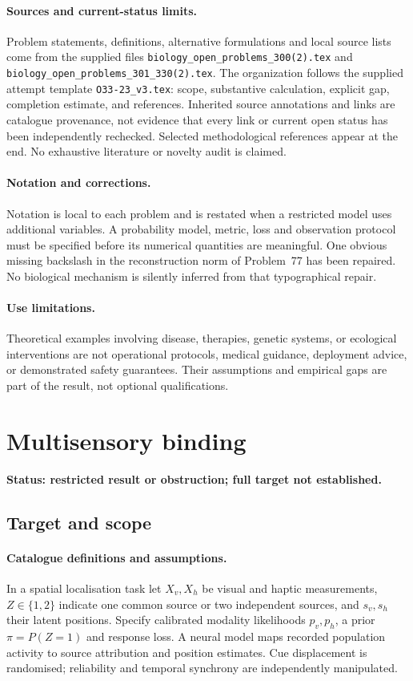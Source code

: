 \documentclass[11pt]{article}
\begin{document}
\paragraph{Sources and current-status limits.}
Problem statements, definitions, alternative formulations and local source lists
come from the supplied files
\texttt{biology\_open\_problems\_300(2).tex} and
\texttt{biology\_open\_problems\_301\_330(2).tex}.
The organization follows the supplied attempt template
\texttt{O33-23\_v3.tex}: scope, substantive calculation, explicit gap,
completion estimate, and references. Inherited source annotations and links are
catalogue provenance, not evidence that every link or current open status has
been independently rechecked. Selected methodological references appear at the
end. No exhaustive literature or novelty audit is claimed.

\paragraph{Notation and corrections.}
Notation is local to each problem and is restated when a restricted model uses
additional variables. A probability model, metric, loss and observation protocol
must be specified before its numerical quantities are meaningful. One obvious
missing backslash in the reconstruction norm of Problem~77 has been repaired.
No biological mechanism is silently inferred from that typographical repair.

\paragraph{Use limitations.}
Theoretical examples involving disease, therapies, genetic systems, or ecological
interventions are not operational protocols, medical guidance, deployment advice,
or demonstrated safety guarantees. Their assumptions and empirical gaps are part
of the result, not optional qualifications.


\section*{Multisensory binding}
\label{prob:111}
\noindent\textbf{Status: restricted result or obstruction; full target not established.}
\subsection{Target and scope}
\paragraph{Catalogue definitions and assumptions.}
In a spatial localisation task let $X_v,X_h$ be visual and haptic measurements, $Z\in\{1,2\}$ indicate one common source or two independent sources, and $s_v,s_h$ their latent positions. Specify calibrated modality likelihoods $p_v,p_h$, a prior $\pi=P(Z=1)$ and response loss. A neural model maps recorded population activity to source attribution and position estimates. Cue displacement is randomised; reliability and temporal synchrony are independently manipulated.
\end{document}
